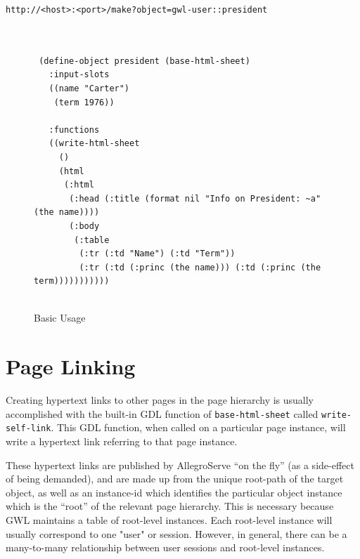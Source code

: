 \documentclass [11pt]{book}
\begin{document}
\begin{verbatim}http://<host>:<port>/make?object=gwl-user::president
\end{verbatim}
\begin{figure}
\begin{lrbox}{\boxedverb}
\begin{minipage}{\linewidth}

\begin{verbatim}


 (define-object president (base-html-sheet)
   :input-slots
   ((name "Carter")
    (term 1976))

   :functions
   ((write-html-sheet 
     ()
     (html
      (:html
       (:head (:title (format nil "Info on President: ~a" (the name))))
       (:body 
        (:table
         (:tr (:td "Name") (:td "Term"))
         (:tr (:td (:princ (the name))) (:td (:princ (the term)))))))))))
    
\end{verbatim}
\end{minipage}
\end{lrbox}
\fbox{\usebox{\boxedverb}}

\caption{Basic Usage}

\label{code:basic-usage}

\end{figure}


\section{Page Linking}

\label{sec:pagelinking}

Creating hypertext links to other pages in the page hierarchy is
usually accomplished with the built-in GDL function of \texttt{base-html-sheet} called \texttt{write-self-link}. This GDL function, when called on a particular page instance, will write 
a hypertext link referring to that page instance.

These hypertext links are published by AllegroServe ``on the fly'' (as
a side-effect of being demanded), and are made up from the unique
root-path of the target object, as well as an instance-id which identifies the particular object instance which is the ``root'' of
the relevant page hierarchy. This is necessary because GWL maintains a
table of root-level instances. Each root-level instance will usually
correspond to one "user" or session. However, in general, there can
be a many-to-many relationship between user sessions and root-level
instances.
\end{document}

